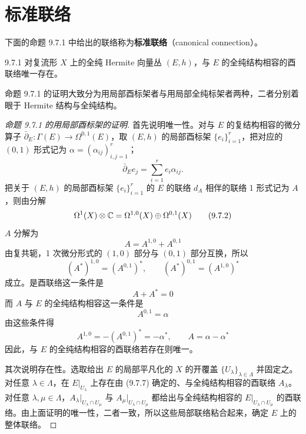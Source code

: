 
\section{标准联络}

下面的命题 9.7.1 中给出的联络称为\textbf{标准联络}（canonical connection）。

\begin{proposition*}{9.7.1}
对复流形 $X$ 上的全纯 Hermite 向量丛 $(E,h)$，与 $E$ 的全纯结构相容的酉联络唯一存在。
\end{proposition*}

命题 9.7.1 的证明大致分为用局部酉标架者与用局部全纯标架者两种，二者分别着眼于 Hermite 结构与全纯结构。

\begin{proof}[命题 9.7.1 的用局部酉标架的证明]
首先说明唯一性。对与 $E$ 的复结构相容的微分算子 $\bar\partial_E\colon \Gamma(E)\to\Omega^{0,1}(E)$，取 $(E,h)$ 的局部酉标架 $\{e_i\}_{i=1}^r$，把对应的 $(0,1)$ 形式记为 $\alpha=(\alpha_{ij})_{i,j=1}^r$；
\begin{equation}
  \bar\partial_E e_j = \sum_{i=1}^r e_i \alpha_{ij}.
  \tag{9.7.1}
\end{equation}
把关于 $(E,h)$ 的局部酉标架 $\{e_i\}_{i=1}^r$ 的 $E$ 的联络 $d_A$ 相伴的联络 1 形式记为 $A$，则由分解
\begin{equation}
  \Omega^1(X)\otimes\mathbb{C} = \Omega^{1,0}(X)\oplus\Omega^{0,1}(X)
  \tag{9.7.2}
\end{equation}
$A$ 分解为
\begin{equation}
  A = A^{1,0} + A^{0,1}
  \tag{9.7.3}
\end{equation}
由复共轭，1 次微分形式的 $(1,0)$ 部分与 $(0,1)$ 部分互换，所以
\begin{equation}
  (A^*)^{1,0} = (A^{0,1})^*,\qquad (A^*)^{0,1} = (A^{1,0})^*
  \tag{9.7.4}
\end{equation}
成立。是酉联络这一条件是
\begin{equation}
  A + A^* = 0
  \tag{9.7.5}
\end{equation}
而 $A$ 与 $E$ 的全纯结构相容这一条件是
\begin{equation}
  A^{0,1} = \alpha
  \tag{9.7.6}
\end{equation}
由这些条件得
\begin{equation}
  A^{1,0} = -(A^{0,1})^* = -\alpha^*,\qquad A = \alpha - \alpha^*
  \tag{9.7.7}
\end{equation}
因此，与 $E$ 的全纯结构相容的酉联络若存在则唯一。

其次说明存在性。选取给出 $E$ 的局部平凡化的 $X$ 的开覆盖 $\{U_\lambda\}_{\lambda\in\Lambda}$ 并固定之。对任意 $\lambda\in\Lambda$，在 $E|_{U_\lambda}$ 上存在由 (9.7.7) 确定的、与全纯结构相容的酉联络 $A_\lambda$。对任意 $\lambda,\mu\in\Lambda$，$A_\lambda|_{U_\lambda\cap U_\mu}$ 与 $A_\mu|_{U_\lambda\cap U_\mu}$ 都给出与全纯结构相容的 $E|_{U_\lambda\cap U_\mu}$ 的酉联络。由上面证明的唯一性，二者一致，所以这些局部联络粘合起来，确定 $E$ 上的整体联络。
\end{proof}


